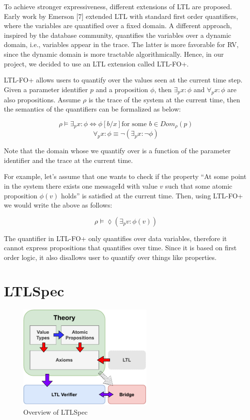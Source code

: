 \documentclass[format=acmsmall, nonacm=true, review=true, screen=true]{acmart}
\begin{document}
To achieve stronger expressiveness, different extensions of LTL are proposed. Early work by Emerson [7] extended LTL with standard first order quantifiers, where the variables are quantified over a fixed domain. A different approach, inspired by the database community, quantifies the variables over a dynamic domain, i.e., variables appear in the trace. The latter is more favorable for RV, since the dynamic domain is more tractable algorithmically. Hence, in our project, we decided to use an LTL extension called LTL-FO+.

LTL-FO+ allows users to quantify over the values seen at the current time step. Given a parameter identifier $p$ and a proposition $\phi$, then $\exists_{p} x : \phi$ and $\forall_{p} x:\phi$ are also propositions. Assume $\rho$ is the trace of the system at the current time, then the semantics of the quantifiers can be formalized as below:

$$\rho\vDash \exists_p x:\phi \Leftrightarrow \phi[b/x] \text{for some }b\in Dom_{\rho}(p)$$
$$\forall_{p} x : \phi \equiv \lnot(\exists_{p}x: \lnot\phi)$$

Note that the domain whose we quantify over is a function of the parameter identifier and the trace at the current time.

For example, let's assume that one wants to check if the property “At some point in the system there exists one messageId with value $v$ such that some atomic proposition $\phi(v)$ holds” is satisfied at the current time. Then, using LTL-FO+ we would write the above as follows:

$$ \rho \vDash \lozenge(\exists_{p} v :\phi(v)) $$


The quantifier in LTL-FO+ only quantifies over data variables, therefore it cannot express propositions that quantifies over time. Since it is based on first order logic, it also disallows user to quantify over things like properties.

\section{LTLSpec}

\begin{figure}[h]
  \includegraphics[width=0.6\textwidth]{images/ltlspec-overview.pdf}
  \centering
  \caption{Overview of LTLSpec}
  \label{fig:overview}
\end{figure}
\end{document}
